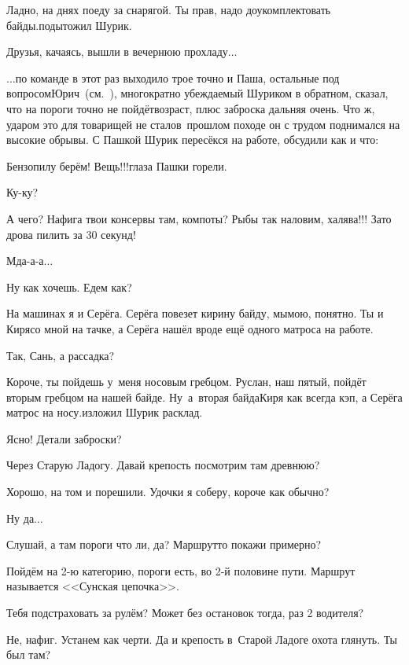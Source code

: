 \diagdash Ладно, на днях поеду за снарягой. Ты прав, надо доукомплектовать байды.\mdash подытожил Шурик.

Друзья, качаясь, вышли в вечернюю прохладу$\ldots$

\vspace{0.5cm}

$\ldots$по команде в этот раз выходило трое точно и Паша, остальные под вопросом\mdash Юрич~(см.~\cite{СоболевВепсскаяЛетопись}), многократно убеждаемый Шуриком в обратном, сказал, что на пороги точно не пойдёт\mdash возраст, плюс заброска дальняя очень. Что ж, ударом это для товарищей не стало\mdash в~прошлом походе он с трудом поднимался на высокие обрывы. С Пашкой Шурик пересёкся на работе, обсудили как и что:

\diagdash Бензопилу берём! Вещь!!!\mdash глаза Пашки горели.

\diagdash Ку-ку?

\diagdash А чего? Нафига твои консервы там, компоты? Рыбы так наловим, халява!!! Зато дрова пилить за 30 секунд!

\diagdash Мда-а-а$\ldots$

\diagdash Ну как хочешь. Едем как?

\diagdash На машинах я и Серёга. Серёга повезет кирину байду, мы\mdash мою, понятно. Ты и Киря\mdash со мной на тачке, а Серёга нашёл вроде ещё одного матроса на работе.

\diagdash Так, Сань, а рассадка?

\diagdash Короче, ты пойдешь у~меня носовым гребцом. Руслан, наш пятый, пойдёт вторым гребцом на нашей байде. Ну~а~вторая байда\mdash Киря как всегда кэп, а Серёга матрос на носу.\mdash изложил Шурик расклад.

\diagdash Ясно! Детали заброски?

\diagdash Через Старую Ладогу. Давай крепость посмотрим там древнюю?

\diagdash Хорошо, на том и порешили. Удочки я соберу, короче как обычно?

\diagdash Ну да$\ldots$

\diagdash Слушай, а там пороги что ли, да? Маршрут\sdash то покажи примерно?

\diagdash Пойдём на 2-ю категорию, пороги есть, во 2-й половине пути. Маршрут называется <<Сунская цепочка>>.

\diagdash Тебя подстраховать за рулём? Может без остановок тогда, раз 2 водителя?

\diagdash Не, нафиг. Устанем как черти. Да и крепость в~Старой Ладоге охота глянуть. Ты был там?

